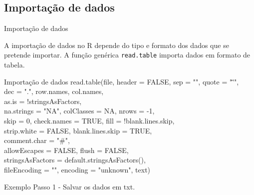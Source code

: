 \documentclass{beamer}
\begin{document}
\subsection{Importação de dados}
  \begin{frame}{Importação de dados}
   
   A importação de dados no R depende do tipo e formato dos dados que se pretende importar. A função genérica \texttt{read.table} importa dados em formato de tabela.
   \begin{block}{Importação de dados}
    read.table(file, header = FALSE, sep = "", quote = "\"'",\\
   \hspace{45pt}       dec = ".", row.names, col.names,\\
   \hspace{45pt}       as.is = !stringsAsFactors,\\
   \hspace{45pt}       na.strings = "NA", colClasses = NA, nrows = -1,\\
   \hspace{45pt}       skip = 0, check.names = TRUE, fill = !blank.lines.skip,\\
   \hspace{45pt}             strip.white = FALSE, blank.lines.skip = TRUE,\\
   \hspace{45pt}             comment.char = "\#",\\
   \hspace{45pt}             allowEscapes = FALSE, flush = FALSE,\\
   \hspace{45pt}             stringsAsFactors = default.stringsAsFactors(),\\
   \hspace{45pt}             fileEncoding = "", encoding = "unknown", text)     
   \end{block}
    
  \end{frame}
  \begin{frame}{Exemplo}
Passo 1 - Salvar os dados em txt.
\centering
 \end{frame}
\end{document}

